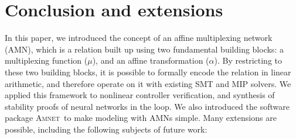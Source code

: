 \documentclass[10pt]{article}
\newcommand{\amnet}{\textsc{Amnet}}
\theoremstyle{remark}
\theoremstyle{definition}
\theoremstyle{plain}
\begin{document}
\section{Conclusion and extensions}\label{sec:extensions}
In this paper, we introduced the concept of an affine multiplexing network
(AMN), which is a relation built up using two fundamental building blocks: a
multiplexing function ($\mu$), and an affine transformation ($\alpha$). By
restricting to these two building blocks, it is possible to formally encode the
relation in linear arithmetic, and therefore operate on it with existing SMT
and MIP solvers. We applied this framework to nonlinear controller
verification, and synthesis of stability proofs of neural networks in the loop.
We also introduced the software package \amnet\ to make modeling with AMNs
simple.  Many extensions are possible, including the following subjects of
future work:
\end{document}
